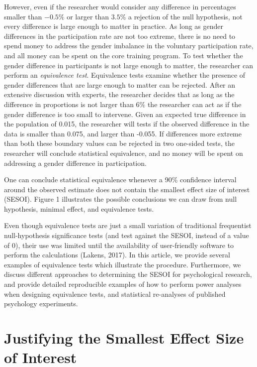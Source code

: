 \documentclass[english,man]{apa6}
\theoremstyle{definition}
\theoremstyle{definition}
\theoremstyle{definition}
\theoremstyle{remark}
\begin{document}
However, even if the researcher would consider any difference in
percentages smaller than \(-0.5 \%\) or larger than \(3.5 \%\) a
rejection of the null hypothesis, not every difference is large enough
to matter in practice. As long as gender differences in the
participation rate are not too extreme, there is no need to spend money
to address the gender imbalance in the voluntary participation rate, and
all money can be spent on the core training program. To test whether the
gender difference in participants is not large enough to matter, the
researcher can perform an \emph{equivalence test}. Equivalence tests
examine whether the presence of gender differences that are large enough
to matter can be rejected. After an extensive discussion with experts,
the researcher decides that as long as the difference in proportions is
not larger than 6\% the researcher can act as if the gender difference
is too small to intervene. Given an expected true difference in the
population of 0.015, the researcher will tests if the observed
difference in the data is smaller than 0.075, and larger than -0.055. If
differences more extreme than both these boundary values can be rejected
in two one-sided tests, the researcher will conclude statistical
equivalence, and no money will be spent on addressing a gender
difference in participation.

One can conclude statistical equivalence whenever a 90\% confidence
interval around the observed estimate does not contain the smallest
effect size of interest (SESOI). Figure 1 illustrates the possible
conclusions we can draw from null hypothesis, minimal effect, and
equivalence tests.

Even though equivalence tests are just a small variation of traditional
frequentist null-hypothesis significance tests (and test against the
SESOI, instead of a value of 0), their use was limited until the
availability of user-friendly software to perform the calculations
(Lakens, 2017). In this article, we provide several examples of
equivalence tests which illustrate the procedure. Furthermore, we
discuss different approaches to determining the SESOI for psychological
research, and provide detailed reproducible examples of how to perform
power analyses when designing equivalence tests, and statistical
re-analyses of published psychology experiments.

\section{Justifying the Smallest Effect Size of
Interest}\label{justifying-the-smallest-effect-size-of-interest}
\end{document}
